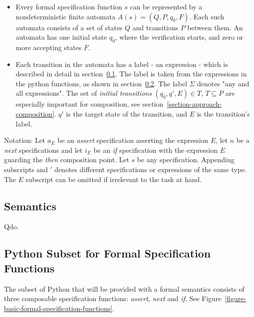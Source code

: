 \documentclass[a4paper,11pt]{kth-mag}
\begin{document}
\begin{itemize}
  \item Every formal specification function $s$ can be represented by a
    nondeterministic finite automata $A(s) = (Q, P, q_0, F)$. Each such
    automata consists of a set of states $Q$ and transitions $P$ between
    them. An automata has one initial state $q_0$, where the verification
    starts, and zero or more accepting states $F$.

  \item Each transition in the automata has a label - an expression - which is
    described in detail in section~\ref{section-approach-semantics}. The label
    is taken from the expressions in the python functions, as shown in
    section~\ref{section-approach-python-subset}. The label $\Sigma$ denotes
    "any and all expressions". The set of \textit{initial transitions} $(q_0,
    q', E) \in T$, $T \subseteq P$ are especially important for composition,
    see section~\ref{section-approach-composition}. $q'$ is the target state of
    the transition, and $E$ is the transition's label.
\end{itemize}

Notation: Let $a_E$ be an \textit{assert} specification asserting the
expression $E$, let $n$ be a \textit{next} specifications and let $i_E$ be an
\textit{if} specification with the expression $E$ guarding the \textit{then}
composition point. Let $s$ be any specification. Appending subscripts and $'$
denotes different specifications or expressions of the same type. The $E$
subscript can be omitted if irrelevant to the task at hand.



\subsection{Semantics} \label{section-approach-semantics}

Qdo.



\subsection{Python Subset for Formal Specification Functions}
\label{section-approach-python-subset}
\lstset{language=Python,numbers=left}

The subset of Python that will be provided with a formal semantics consists of
three composable specification functions: \textit{assert},
\textit{next} and \textit{if}. See
Figure~\ref{figure-basic-formal-specification-functions}.
\end{document}
